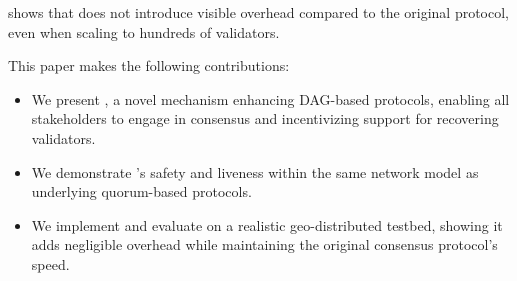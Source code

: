  shows that \sysname does not introduce visible overhead compared to the original protocol, even when scaling to hundreds of validators.

This paper makes the following contributions:
\begin{itemize}
      \item We present \sysname, a novel mechanism enhancing DAG-based protocols, enabling all stakeholders to engage in consensus and incentivizing support for recovering validators.
      \item We demonstrate \sysname's safety and liveness within the same network model as underlying quorum-based protocols.
      \item We implement and evaluate \sysname on a realistic geo-distributed testbed, showing it adds negligible overhead while maintaining the original consensus protocol's speed.
\end{itemize}

